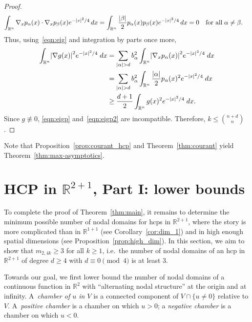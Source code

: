 \documentclass[AHL,Unicode,longabstracts,published]{cedram}
\newcommand{\R}{\mathbb{R}}
\newcommand{\abs}[1]{\left \lvert #1 \right \rvert}
\let\originalleft\left
\let\originalright\right
\renewcommand{\left}{\mathopen{}\mathclose\bgroup\originalleft}
\renewcommand{\right}{\aftergroup\egroup\originalright}
\newcommand{\R}{\mathbb{R}}
\begin{document}
\begin{proof}
\begin{align*}
\int_{\R^n} \nabla_x p_\alpha(x)\cdot \nabla_x p_\beta(x) e^{-\abs{x}^2/4} \, dx & = \int_{\R^n} \frac{\abs{\beta}}{2} p_\alpha(x) p_\beta(x) e^{-\abs{x}^2/4} \, dx = 0\quad\text{for all}\;\alpha\neq\beta.
\end{align*}
Thus, using~\eqref{eqn:eig} and integration by parts once more,
\begin{equation}\label{eqn:eigp2}
\begin{aligned}[t]
\int_{\R^n} \abs{\nabla g(x)}^2 e^{-\abs{x}^2/4} \; dx &= \sum_{\abs{\alpha} > d} b_\alpha^2 \int_{\R^n} \abs{\nabla_x p_\alpha(x)}^2 e^{-\abs{x}^2/4} \; dx \\
&= \sum_{\abs{\alpha} > d} b_\alpha^2 \int_{\R^n} \frac{\abs{\alpha}}{2} p_\alpha(x)^2 e^{-\abs{x}^2/4} \; dx \\
&\ge \frac{d+1}{2} \int_{\R^n} g(x)^2 e^{-\abs{x}^2/4} \; dx.
\end{aligned}
\end{equation}
Since $g\not\equiv 0$, \eqref{eqn:eigp} and~\eqref{eqn:eigp2} are incompatible. Therefore, $k \le \binom{n+d}{n}$.
\end{proof}

Note that Proposition~\ref{prop:courant_hcp} and Theorem~\ref{thm:courant} yield Theorem~\ref{thm:max-asymptotics}.

\section{HCP in \texorpdfstring{$\R^{2+1}$}{2+1 dimensions}, Part I: lower bounds}\label{sec:dim_3_low}

To complete the proof of Theorem~\ref{thm:main}, it remains to determine the minimum possible number of nodal domains for hcps in $\R^{2+1}$, where the story is more complicated than in $\R^{1+1}$ (see Corollary~\ref{cor:dim_1}) and in high enough spatial dimensions (see Proposition~\ref{prop:high_dim}). In this section, we aim to show that $m_{2,4k}\geq 3$ for all $k\geq 1$, i.e.~the number of nodal domains of an hcp in $\R^{2+1}$ of degree $d\geq 4$ with $d \equiv 0 \pmod 4$ is at least 3.

Towards our goal, we first lower bound the number of nodal domains of a continuous function in $\R^2$ with ``alternating nodal structure'' at the origin and at infinity. A~\emph{chamber of $u$ in $V$} is a connected component of $V \cap \{ u \ne 0\}$ relative to $V$. A~\emph{positive chamber} is a chamber on which $u>0$; a \emph{negative chamber} is a chamber on which $u<0$.
\end{document}

